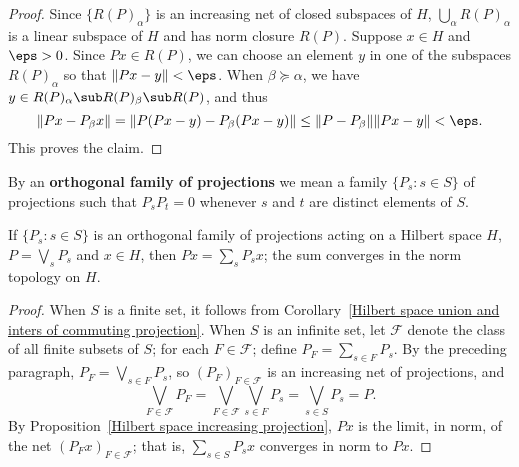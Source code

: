 \begin{proof}
Since $\{R(P)_\alpha\}$ is an increasing net of closed subspaces of $H$, $\bigcup_\alpha R(P)_\alpha$ is a linear subspace of $H$ and has norm closure $R(P)$. Suppose $x\in H$ and $\eps>0$. Since $Px\in R(P)$, we can choose an element $y$ in one of the subspaces $R(P)_\alpha$ so that $\|Px-y\|<\eps$. When $\beta\succeq\alpha$, we have $y\in R(P)_\alpha\sub R(P)_\beta\sub R(P)$, and thus
\[\|Px-P_\beta x\|=\|P(Px-y)-P_\beta(Px-y)\|\leq\|P-P_\beta\|\|Px-y\|<\eps.\]
This proves the claim.
\end{proof}
By an \textbf{orthogonal family of projections} we mean a family $\{P_s:s\in S\}$ of projections such that $P_sP_t=0$ whenever $s$ and $t$ are distinct elements of $S$.
\begin{proposition}\label{Hilbert space union of orthogonal projections}
If $\{P_s:s\in S\}$ is an orthogonal family of projections acting on a Hilbert space $H$, $P=\bigvee_sP_s$ and $x\in H$, then $Px=\sum_sP_sx$; the sum converges in the norm topology on $H$.
\end{proposition}
\begin{proof}
When $S$ is a finite set, it follows from Corollary~\ref{Hilbert space union and inters of commuting projection}. When $S$ is an infinite set, let $\mathcal{F}$ denote the class of all finite subsets of $S$; for each $F\in\mathcal{F}$; define $P_F=\sum_{s\in F}P_s$. By the preceding paragraph, $P_F=\bigvee_{s\in F}P_s$, so $(P_F)_{F\in\mathcal{F}}$ is an increasing net of projections, and
\[\bigvee_{F\in\mathcal{F}}P_F=\bigvee_{F\in\mathcal{F}}\bigvee_{s\in F}P_s=\bigvee_{s\in S}P_s=P.\]
By Proposition~\ref{Hilbert space increasing projection}, $Px$ is the limit, in norm, of the net $(P_Fx)_{F\in\mathcal{F}}$; that is, $\sum_{s\in S}P_sx$ converges in norm to $Px$.
\end{proof}
